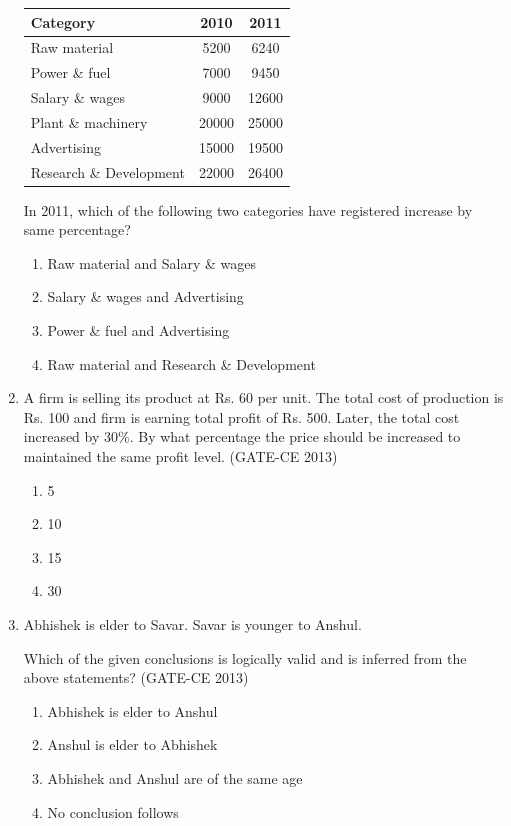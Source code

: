 \documentclass[journal,12pt,onecolumn]{article}
\theoremstyle{remark}
\begin{document}
\begin{enumerate}
    \begin{table}[H]
    \centering
    \begin{tabular}{|l|c|c|}
    \hline
    \textbf{Category} & \textbf{2010} & \textbf{2011} \\
    \hline
    Raw material & 5200 & 6240 \\
    Power \& fuel & 7000 & 9450 \\
    Salary \& wages & 9000 & 12600 \\
    Plant \& machinery & 20000 & 25000 \\
    Advertising & 15000 & 19500 \\
    Research \& Development & 22000 & 26400 \\
    \hline
    \end{tabular}
    \end{table}
    
    In 2011, which of the following two categories have registered increase by same percentage?
    \begin{enumerate}
        \item Raw material and Salary \& wages 
        \item Salary \& wages and Advertising 
        \item Power \& fuel and Advertising 
        \item Raw material and Research \& Development
    \end{enumerate}
    
    \item A firm is selling its product at Rs. 60 per unit. The total cost of production is Rs. 100 and firm is earning total profit of Rs. 500. Later, the total cost increased by 30\%. By what percentage the price should be increased to maintained the same profit level. (GATE-CE 2013)
    \begin{multicols}{4}
    \begin{enumerate}
        \item 5 
        \item 10 
        \item 15 
        \item 30
    \end{enumerate}
    \end{multicols}
    
    \item Abhishek is elder to Savar.
    Savar is younger to Anshul.
    
    Which of the given conclusions is logically valid and is inferred from the above statements? (GATE-CE 2013)
    \begin{enumerate}
        \item Abhishek is elder to Anshul 
        \item Anshul is elder to Abhishek 
        \item Abhishek and Anshul are of the same age 
        \item No conclusion follows
    \end{enumerate}
\end{enumerate}
\end{document}
